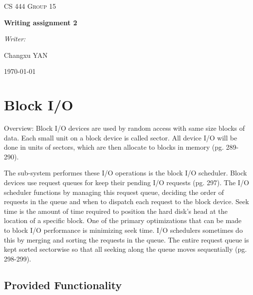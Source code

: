 \documentclass[10pt,draftclsnofoot,onecolumn,journal,compsoc]{IEEEtran}
\newcommand{\tab}{\hspace*{2em}} %
\begin{document}
\begin{titlepage}
\begin{center}
    \vfill
    \textsc{\LARGE CS 444 Group 15}\par
    \vspace{1cm}
    { \huge \bfseries Writing assignment 2 \par}
    \vfill
    \emph{Writer:}\par
    Changxu \textsc{YAN}\par
    \vfill
    {\large \today\par}
\end{center}
\end{titlepage}


\section*{Block I/O}
\tab Overview: Block I/O devices are used by random access with same size blocks of data. Each small unit on a block device is called sector. All device I/O will be done in units of sectors, which are then allocate to blocks in memory \cite{Love}(pg. 289-290).

\tab The sub-system performes these I/O operations is the block I/O scheduler. Block devices use request queues for keep their pending I/O requests \cite{Love}(pg. 297). The I/O scheduler functions by managing this request queue, deciding the order of requests in the queue and when to dispatch each request to the block device. Seek time is the amount of time required to position the hard disk's head at the location of a specific block. One of the primary optimizations that can be made to block I/O performance is minimizing seek time. I/O schedulers sometimes do this by merging and sorting the requests in the queue. The entire request queue is kept sorted sectorwise so that all seeking along the queue moves sequentially \cite{Love}(pg. 298-299). 

\subsection*{Provided Functionality}
\end{document}
